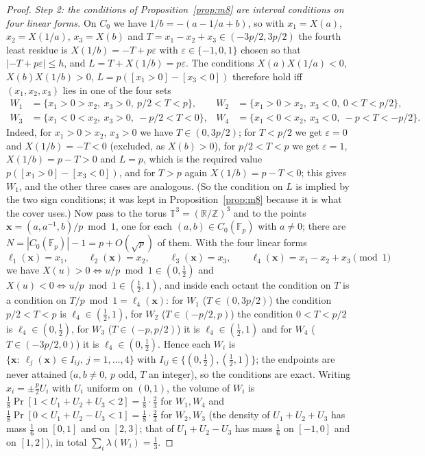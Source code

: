 \documentclass[11pt]{article}
\theoremstyle{remark}
\newcommand{\Fp}{\mathbb{F}_p}
\begin{document}
\begin{proof}
\emph{Step 2: the conditions of Proposition~\ref{prop:m8} are interval conditions on four linear forms.}  On $C_0$ we have
$1/b=-(a-1/a+b)$, so with $x_1=X(a)$, $x_2=X(1/a)$, $x_3=X(b)$ and $T=x_1-x_2+x_3\in(-3p/2,3p/2)$ the fourth least residue is
$X(1/b)=-T+p\varepsilon$ with $\varepsilon\in\{-1,0,1\}$ chosen so that $|-T+p\varepsilon|\le h$, and $L=T+X(1/b)=p\varepsilon$.  The
conditions $X(a)X(1/a)<0$, $X(b)X(1/b)>0$, $L=p([x_1>0]-[x_3<0])$ therefore hold iff $(x_1,x_2,x_3)$ lies in one of the four sets
\begin{align*}
 W_1&=\{x_1>0>x_2,\ x_3>0,\ p/2<T<p\},& W_2&=\{x_1>0>x_2,\ x_3<0,\ 0<T<p/2\},\\
 W_3&=\{x_1<0<x_2,\ x_3>0,\ -p/2<T<0\},& W_4&=\{x_1<0<x_2,\ x_3<0,\ -p<T<-p/2\}.
\end{align*}
Indeed, for $x_1>0>x_2$, $x_3>0$ we have $T\in(0,3p/2)$; for $T<p/2$ we get $\varepsilon=0$ and $X(1/b)=-T<0$ (excluded,
as $X(b)>0$), for $p/2<T<p$ we get $\varepsilon=1$, $X(1/b)=p-T>0$ and $L=p$, which is the required value $p([x_1>0]-[x_3<0])$,
and for $T>p$ again $X(1/b)=p-T<0$; this gives $W_1$, and the other three cases are analogous.  (So the condition on $L$ is implied by
the two sign conditions; it was kept in Proposition~\ref{prop:m8} because it is what the cover uses.)  Now pass to the torus
$\mathbb T^3=(\mathbb R/\mathbb Z)^3$ and to the points $\mathbf x=(a,a^{-1},b)/p \bmod 1$, one for each $(a,b)\in C_0(\Fp)$ with $a\ne0$;
there are $N=|C_0(\Fp)|-1=p+O(\sqrt p)$ of them.  With the four linear forms
\[
 \ell_1(\mathbf x)=x_1,\qquad \ell_2(\mathbf x)=x_2,\qquad \ell_3(\mathbf x)=x_3,\qquad \ell_4(\mathbf x)=x_1-x_2+x_3\pmod 1
\]
we have $X(u)>0\iff u/p\bmod1\in(0,\tfrac12)$ and $X(u)<0\iff u/p\bmod1\in(\tfrac12,1)$, and inside each octant the condition on $T$ is a
condition on $T/p\bmod1=\ell_4(\mathbf x)$: for $W_1$ ($T\in(0,3p/2)$) the condition $p/2<T<p$ is $\ell_4\in(\tfrac12,1)$, for $W_2$
($T\in(-p/2,p)$) the condition $0<T<p/2$ is $\ell_4\in(0,\tfrac12)$, for $W_3$ ($T\in(-p,p/2)$) it is $\ell_4\in(\tfrac12,1)$ and for $W_4$
($T\in(-3p/2,0)$) it is $\ell_4\in(0,\tfrac12)$.  Hence each $W_i$ is $\{\mathbf x:\ \ell_j(\mathbf x)\in I_{ij},\ j=1,\dots,4\}$ with
$I_{ij}\in\{(0,\tfrac12),(\tfrac12,1)\}$; the endpoints are never attained ($a,b\ne0$, $p$ odd, $T$ an integer), so the conditions
are exact.  Writing $x_i=\pm\tfrac p2U_i$ with $U_i$ uniform on $(0,1)$, the volume of $W_i$ is
$\tfrac18\Pr[1<U_1+U_2+U_3<2]=\tfrac18\cdot\tfrac23$ for $W_1,W_4$ and $\tfrac18\Pr[0<U_1+U_2-U_3<1]=\tfrac18\cdot\tfrac23$ for
$W_2,W_3$ (the density of $U_1+U_2+U_3$ has mass $\tfrac16$ on $[0,1]$ and on $[2,3]$; that of $U_1+U_2-U_3$ has mass $\tfrac16$ on
$[-1,0]$ and on $[1,2]$), in total $\sum_i\lambda(W_i)=\tfrac13$.


\end{proof}
\end{document}
